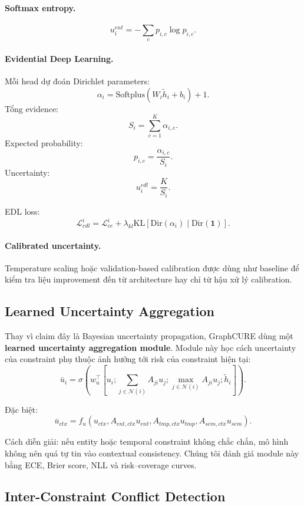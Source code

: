 \documentclass[11pt,a4paper]{article}
\begin{document}
\paragraph{Softmax entropy.}
\[
u_i^{ent} = -\sum_{c} p_{i,c}\log p_{i,c}.
\]

\paragraph{Evidential Deep Learning.}
Mỗi head dự đoán Dirichlet parameters:
\[
\alpha_i = \text{Softplus}(W_i\tilde{h}_i+b_i)+1.
\]
Tổng evidence:
\[
S_i = \sum_{c=1}^{K}\alpha_{i,c}.
\]
Expected probability:
\[
p_{i,c} = \frac{\alpha_{i,c}}{S_i}.
\]
Uncertainty:
\[
u_i^{edl} = \frac{K}{S_i}.
\]

EDL loss:
\[
\mathcal{L}_{edl}^{i} =
\mathcal{L}_{ce}^{i}
+
\lambda_{kl}\text{KL}\left[
\text{Dir}(\alpha_i)\mid \text{Dir}(\mathbf{1})
\right].
\]

\paragraph{Calibrated uncertainty.}
Temperature scaling hoặc validation-based calibration được dùng như baseline để kiểm tra liệu improvement đến từ architecture hay chỉ từ hậu xử lý calibration.

\subsection{Learned Uncertainty Aggregation}

Thay vì claim đây là Bayesian uncertainty propagation, GraphCURE dùng một \textbf{learned uncertainty aggregation module}. Module này học cách uncertainty của constraint phụ thuộc ảnh hưởng tới risk của constraint hiện tại:
\[
\bar{u}_i =
\sigma \left(
w_u^\top
\left[
u_i;
\sum_{j\in\mathcal{N}(i)}A_{ji}u_j;
\max_{j\in\mathcal{N}(i)}A_{ji}u_j;
\tilde{h}_i
\right]
\right).
\]

Đặc biệt:
\[
\bar{u}_{ctx}
=
f_u(
u_{ctx},
A_{ent,ctx}u_{ent},
A_{tmp,ctx}u_{tmp},
A_{sem,ctx}u_{sem}
).
\]

Cách diễn giải: nếu entity hoặc temporal constraint không chắc chắn, mô hình không nên quá tự tin vào contextual consistency. Chúng tôi đánh giá module này bằng ECE, Brier score, NLL và risk--coverage curves.

\subsection{Inter-Constraint Conflict Detection}
\end{document}
